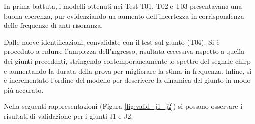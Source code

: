 \documentclass{article}
\begin{document}
In prima battuta, i modelli ottenuti nei Test T01, T02 e T03 presentavano una buona coerenza, pur evidenziando un aumento dell'incertezza 
in corrispondenza delle frequenze di anti-risonanza. 

Dalle nuove identificazioni, convalidate con il test sul giunto (T04). 
Si è proceduto a ridurre l'ampiezza dell'ingresso, risultata eccessiva rispetto a quella dei giunti precedenti, 
stringendo contemporaneamente lo spettro del segnale chirp e aumentando la durata della prova per migliorare la stima in frequenza.
Infine, si è incrementato l'ordine del modello per descrivere la dinamica del giunto in modo più accurato.

Nella seguenti rappresentazioni (Figura \ref{fig:valid_j1_j2}) si possono osservare i risultati di validazione 
per i giunti J1 e J2.
\end{document}

